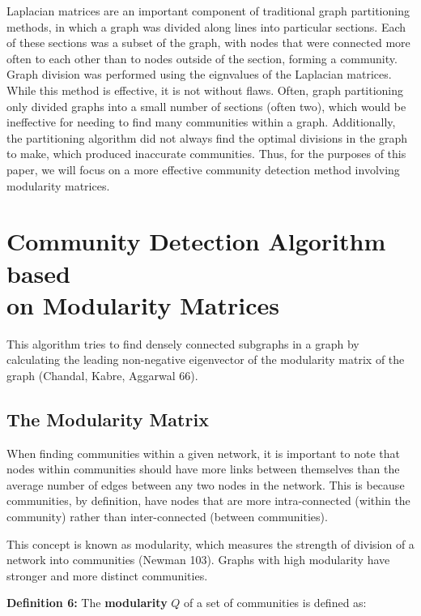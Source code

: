 \documentclass{article}
\begin{document}
\bigskip 

Laplacian matrices are an important component of traditional graph partitioning methods, in which a graph was divided along lines into particular sections.
Each of these sections was a subset of the graph, with nodes that were connected more often to each other than to nodes outside of the section, forming a community. 
Graph division was performed using the eignvalues of the Laplacian matrices. While this method is effective, it is not without flaws. 
Often, graph partitioning only divided graphs into a small number of sections (often two), which would be ineffective for needing to find many communities within a graph.
Additionally, the partitioning algorithm did not always find the optimal divisions in the graph to make, which produced inaccurate communities.
Thus, for the purposes of this paper, we will focus on a more effective community detection method involving modularity matrices.

\bigskip 

\section*{Community Detection Algorithm based \\ on Modularity Matrices}
This algorithm tries to find densely connected subgraphs in a graph by calculating the leading non-negative eigenvector of the modularity matrix of the graph (Chandal, Kabre, Aggarwal 66). 


\subsection*{The Modularity Matrix}
When finding communities within a given network, it is important to note that nodes within communities should have more links between themselves than the average number of edges between any two nodes in the network. 
This is because communities, by definition, have nodes that are more intra-connected (within the community) rather than inter-connected (between communities).

This concept is known as modularity, which measures the strength of division of a network into communities (Newman 103). 
Graphs with high modularity have stronger and more distinct communities.

\bigskip

\textbf{Definition 6:} The \textbf{modularity} $Q$ of a set of communities is defined as: 

\bigskip
\end{document}
